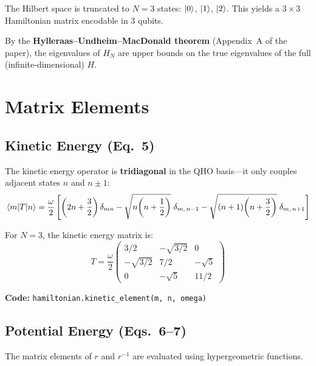 \documentclass[11pt,a4paper]{article}
\begin{document}
The Hilbert space is truncated to $N=3$ states: $\ket{0}$, $\ket{1}$, $\ket{2}$. This yields a $3\times 3$ Hamiltonian matrix encodable in 3 qubits.

By the \textbf{Hylleraas--Undheim--MacDonald theorem} (Appendix~A of the paper), the eigenvalues of $H_N$ are upper bounds on the true eigenvalues of the full (infinite-dimensional) $H$.


\section{Matrix Elements}

\subsection{Kinetic Energy (Eq.~5)}

The kinetic energy operator is \textbf{tridiagonal} in the QHO basis---it only couples adjacent states $n$ and $n\pm 1$:
\begin{equation}
  \mel{m}{T}{n} = \frac{\omega}{2}\left[
    \left(2n + \frac{3}{2}\right)\delta_{mn}
    - \sqrt{n\!\left(n+\frac{1}{2}\right)}\;\delta_{m,\,n-1}
    - \sqrt{(n+1)\!\left(n+\frac{3}{2}\right)}\;\delta_{m,\,n+1}
  \right]
  \label{eq:kinetic}
\end{equation}

For $N=3$, the kinetic energy matrix is:
\begin{equation}
  T = \frac{\omega}{2}
  \begin{pmatrix}
    3/2 & -\sqrt{3/2} & 0 \\
    -\sqrt{3/2} & 7/2 & -\sqrt{5} \\
    0 & -\sqrt{5} & 11/2
  \end{pmatrix}
\end{equation}

\vspace{0.3em}
\noindent\textbf{Code:} \texttt{hamiltonian.kinetic\_element(m, n, omega)}

\subsection{Potential Energy (Eqs.~6--7)}

The matrix elements of $r$ and $r^{-1}$ are evaluated using hypergeometric functions.
\end{document}
